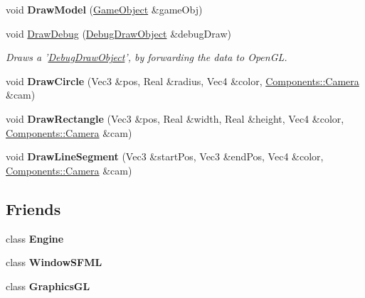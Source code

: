 \begin{DoxyCompactItemize}
\item 
\hypertarget{classDCEngine_1_1Systems_1_1Graphics_a08747ee660111062c93c26f19654cf6f}{void {\bfseries Draw\-Model} (\hyperlink{classDCEngine_1_1GameObject}{Game\-Object} \&game\-Obj)}\label{classDCEngine_1_1Systems_1_1Graphics_a08747ee660111062c93c26f19654cf6f}

\item 
void \hyperlink{classDCEngine_1_1Systems_1_1Graphics_a181568d6f838450ff835f1ba4d673753}{Draw\-Debug} (\hyperlink{classDCEngine_1_1DebugDrawObject}{Debug\-Draw\-Object} \&debug\-Draw)
\begin{DoxyCompactList}\small\item\em Draws a '\hyperlink{classDCEngine_1_1DebugDrawObject}{Debug\-Draw\-Object}', by forwarding the data to Open\-G\-L. \end{DoxyCompactList}\item 
\hypertarget{classDCEngine_1_1Systems_1_1Graphics_a5b344477a65797acc91ac20a9a4d5017}{void {\bfseries Draw\-Circle} (Vec3 \&pos, Real \&radius, Vec4 \&color, \hyperlink{classDCEngine_1_1Components_1_1Camera}{Components\-::\-Camera} \&cam)}\label{classDCEngine_1_1Systems_1_1Graphics_a5b344477a65797acc91ac20a9a4d5017}

\item 
\hypertarget{classDCEngine_1_1Systems_1_1Graphics_a0db2be644b4d1e6df44ce02fcf7ca9f2}{void {\bfseries Draw\-Rectangle} (Vec3 \&pos, Real \&width, Real \&height, Vec4 \&color, \hyperlink{classDCEngine_1_1Components_1_1Camera}{Components\-::\-Camera} \&cam)}\label{classDCEngine_1_1Systems_1_1Graphics_a0db2be644b4d1e6df44ce02fcf7ca9f2}

\item 
\hypertarget{classDCEngine_1_1Systems_1_1Graphics_ad773d5121d61f74afb142f003e3d99f1}{void {\bfseries Draw\-Line\-Segment} (Vec3 \&start\-Pos, Vec3 \&end\-Pos, Vec4 \&color, \hyperlink{classDCEngine_1_1Components_1_1Camera}{Components\-::\-Camera} \&cam)}\label{classDCEngine_1_1Systems_1_1Graphics_ad773d5121d61f74afb142f003e3d99f1}

\end{DoxyCompactItemize}
\subsection*{Friends}
\begin{DoxyCompactItemize}
\item 
\hypertarget{classDCEngine_1_1Systems_1_1Graphics_a3e1914489e4bed4f9f23cdeab34a43dc}{class {\bfseries Engine}}\label{classDCEngine_1_1Systems_1_1Graphics_a3e1914489e4bed4f9f23cdeab34a43dc}

\item 
\hypertarget{classDCEngine_1_1Systems_1_1Graphics_a21ff356e0c8c90508c38461caca6c778}{class {\bfseries Window\-S\-F\-M\-L}}\label{classDCEngine_1_1Systems_1_1Graphics_a21ff356e0c8c90508c38461caca6c778}

\item 
\hypertarget{classDCEngine_1_1Systems_1_1Graphics_ae9935fef993313b67d691534d6fe5b4f}{class {\bfseries Graphics\-G\-L}}\label{classDCEngine_1_1Systems_1_1Graphics_ae9935fef993313b67d691534d6fe5b4f}

\end{DoxyCompactItemize}
